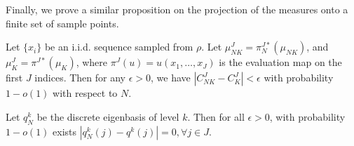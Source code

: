 \documentclass[final]{siamart0516}
\begin{document}
Finally, we prove a similar proposition on the projection of the measures onto a finite set of sample points.  
 
\begin{proposition}
Let $\{x_i\}$ be an i.i.d. sequence sampled from $\rho$.  Let $\mu_{NK}^J = \pi_N^{J*}(\mu_{NK})$, and $\mu_K^J = \pi^{J*}(\mu_K)$, where $\pi^J(u) = u(x_1, \dots, x_J)$ is the evaluation map on the first $J$ indices. Then for any $\epsilon>0$, we have $|C_{NK}^J - C^J_K| < \epsilon$ with probability $1 - o(1)$ with respect to $N$. 
\end{proposition}





\begin{corollary}
Let $q^k_N$ be the discrete eigenbasis of level $k$. Then for all $\epsilon > 0$, with probability $1 - o(1)$ exists $|q^k_N(j) - q^k(j)| = 0, \forall j \in J$.
\end{corollary}




\end{document}
